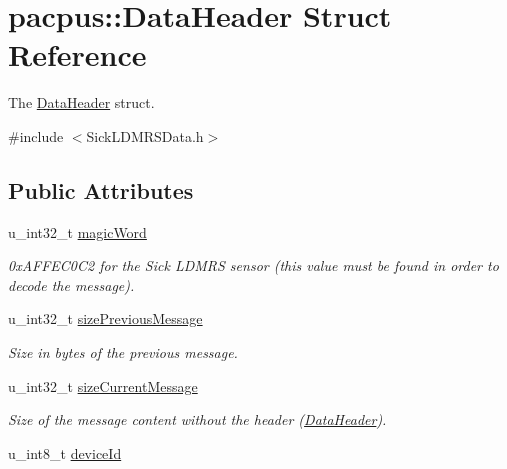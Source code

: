 \hypertarget{structpacpus_1_1DataHeader}{\section{pacpus\-:\-:Data\-Header Struct Reference}
\label{structpacpus_1_1DataHeader}
}


The \hyperlink{structpacpus_1_1DataHeader}{Data\-Header} struct.  




{\ttfamily \#include $<$Sick\-L\-D\-M\-R\-S\-Data.\-h$>$}

\subsection*{Public Attributes}
\begin{DoxyCompactItemize}
\item 
\hypertarget{structpacpus_1_1DataHeader_a98d42f04ff2e365418a3bd7310f6922e}{u\-\_\-int32\-\_\-t \hyperlink{structpacpus_1_1DataHeader_a98d42f04ff2e365418a3bd7310f6922e}{magic\-Word}}\label{structpacpus_1_1DataHeader_a98d42f04ff2e365418a3bd7310f6922e}

\begin{DoxyCompactList}\small\item\em 0x\-A\-F\-F\-E\-C0\-C2 for the Sick L\-D\-M\-R\-S sensor (this value must be found in order to decode the message). \end{DoxyCompactList}\item 
\hypertarget{structpacpus_1_1DataHeader_acfc8ced0fba207de34a1f7215d4a6cb5}{u\-\_\-int32\-\_\-t \hyperlink{structpacpus_1_1DataHeader_acfc8ced0fba207de34a1f7215d4a6cb5}{size\-Previous\-Message}}\label{structpacpus_1_1DataHeader_acfc8ced0fba207de34a1f7215d4a6cb5}

\begin{DoxyCompactList}\small\item\em Size in bytes of the previous message. \end{DoxyCompactList}\item 
\hypertarget{structpacpus_1_1DataHeader_a71a67d094751e3c5a9117d5df5e86f62}{u\-\_\-int32\-\_\-t \hyperlink{structpacpus_1_1DataHeader_a71a67d094751e3c5a9117d5df5e86f62}{size\-Current\-Message}}\label{structpacpus_1_1DataHeader_a71a67d094751e3c5a9117d5df5e86f62}

\begin{DoxyCompactList}\small\item\em Size of the message content without the header (\hyperlink{structpacpus_1_1DataHeader}{Data\-Header}). \end{DoxyCompactList}\item 
\hypertarget{structpacpus_1_1DataHeader_a15664fcb384de15a6507e4da57294781}{u\-\_\-int8\-\_\-t \hyperlink{structpacpus_1_1DataHeader_a15664fcb384de15a6507e4da57294781}{device\-Id}}\label{structpacpus_1_1DataHeader_a15664fcb384de15a6507e4da57294781}


\end{DoxyCompactItemize}
